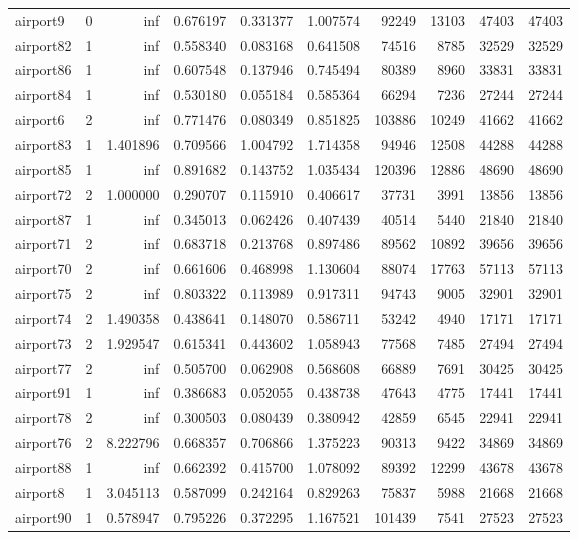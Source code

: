 \begin{longtable}{|l|r|r|r|r|r|r|r|r|r|}
airport9 & 0 & inf & 0.676197 & 0.331377 & 1.007574 & 92249 & 13103 & 47403 & 47403 \\
airport82 & 1 & inf & 0.558340 & 0.083168 & 0.641508 & 74516 & 8785 & 32529 & 32529 \\
airport86 & 1 & inf & 0.607548 & 0.137946 & 0.745494 & 80389 & 8960 & 33831 & 33831 \\
airport84 & 1 & inf & 0.530180 & 0.055184 & 0.585364 & 66294 & 7236 & 27244 & 27244 \\
airport6 & 2 & inf & 0.771476 & 0.080349 & 0.851825 & 103886 & 10249 & 41662 & 41662 \\
airport83 & 1 & 1.401896 & 0.709566 & 1.004792 & 1.714358 & 94946 & 12508 & 44288 & 44288 \\
airport85 & 1 & inf & 0.891682 & 0.143752 & 1.035434 & 120396 & 12886 & 48690 & 48690 \\
airport72 & 2 & 1.000000 & 0.290707 & 0.115910 & 0.406617 & 37731 & 3991 & 13856 & 13856 \\
airport87 & 1 & inf & 0.345013 & 0.062426 & 0.407439 & 40514 & 5440 & 21840 & 21840 \\
airport71 & 2 & inf & 0.683718 & 0.213768 & 0.897486 & 89562 & 10892 & 39656 & 39656 \\
airport70 & 2 & inf & 0.661606 & 0.468998 & 1.130604 & 88074 & 17763 & 57113 & 57113 \\
airport75 & 2 & inf & 0.803322 & 0.113989 & 0.917311 & 94743 & 9005 & 32901 & 32901 \\
airport74 & 2 & 1.490358 & 0.438641 & 0.148070 & 0.586711 & 53242 & 4940 & 17171 & 17171 \\
airport73 & 2 & 1.929547 & 0.615341 & 0.443602 & 1.058943 & 77568 & 7485 & 27494 & 27494 \\
airport77 & 2 & inf & 0.505700 & 0.062908 & 0.568608 & 66889 & 7691 & 30425 & 30425 \\
airport91 & 1 & inf & 0.386683 & 0.052055 & 0.438738 & 47643 & 4775 & 17441 & 17441 \\
airport78 & 2 & inf & 0.300503 & 0.080439 & 0.380942 & 42859 & 6545 & 22941 & 22941 \\
airport76 & 2 & 8.222796 & 0.668357 & 0.706866 & 1.375223 & 90313 & 9422 & 34869 & 34869 \\
airport88 & 1 & inf & 0.662392 & 0.415700 & 1.078092 & 89392 & 12299 & 43678 & 43678 \\
airport8 & 1 & 3.045113 & 0.587099 & 0.242164 & 0.829263 & 75837 & 5988 & 21668 & 21668 \\
airport90 & 1 & 0.578947 & 0.795226 & 0.372295 & 1.167521 & 101439 & 7541 & 27523 & 27523 \\

\end{longtable}
